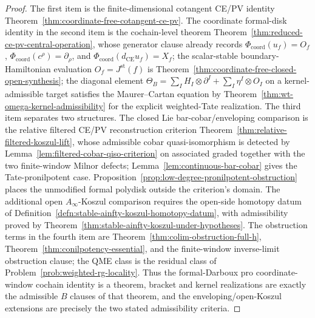 \documentclass[11pt]{memoir}
\begin{document}
\begin{proof}
  The first item is the finite-dimensional cotangent CE/PV identity
  Theorem~\ref{thm:coordinate-free-cotangent-ce-pv}.  The coordinate
  formal-disk identity in the second item is the cochain-level theorem
  Theorem~\ref{thm:reduced-ce-pv-central-operation}, whose generator
  clause already records \(\Phi_{\mathrm{coord}}(u_f)=O_f\),
  \(\Phi_{\mathrm{coord}}(c^\rho)=\partial_\rho\), and
  \(\Phi_{\mathrm{coord}}(d_{\mathrm{CE}}u_f)=X_f\); the
  scalar-stable boundary-Hamiltonian evaluation \(O_f=J^{\mathrm{st}}(f)\) is
  Theorem~\ref{thm:coordinate-free-closed-open-synthesis}; the
  diagonal element \(\Theta_B=\sum_I H_I\otimes\partial^I
  +\sum_I\eta^I\otimes O_I\)
  on a kernel-admissible target satisfies the Maurer--Cartan equation
	  by Theorem~\ref{thm:wt-omega-kernel-admissibility} for the explicit
	  weighted-Tate realization.  The third item separates two structures.  The
  closed Lie bar-cobar/enveloping comparison is the relative filtered
  CE/PV reconstruction criterion
  Theorem~\ref{thm:relative-filtered-koszul-lift}, whose admissible
  cobar quasi-isomorphism is detected by
  Lemma~\ref{lem:filtered-cobar-qiso-criterion} on associated graded
  together with the two finite-window Milnor defects;
  Lemma~\ref{lem:continuous-bar-cobar} gives the Tate-pronilpotent
  case.  Proposition~\ref{prop:low-degree-pronilpotent-obstruction}
  places the unmodified formal polydisk outside the criterion's domain.
  The
  additional open \(A_\infty\)-Koszul comparison requires the open-side
  homotopy datum of
  Definition~\ref{defn:stable-ainfty-koszul-homotopy-datum}, with
  admissibility proved by
  Theorem~\ref{thm:stable-ainfty-koszul-under-hypotheses}.  The
  obstruction
  terms in the fourth item are
  Theorem~\ref{thm:colim-obstruction-full-h},
  Theorem~\ref{thm:conilpotency-essential}, and the finite-window
  inverse-limit obstruction clause; the QME class is the
  residual class of Problem~\ref{prob:weighted-rg-locality}.  Thus the
  formal-Darboux pro coordinate-window cochain identity is a theorem,
	  bracket and kernel realizations are exactly the admissible \(B\)
	  clauses of that theorem, and the enveloping/open-Koszul extensions are
  precisely the two stated admissibility criteria.
\end{proof}
\end{document}
